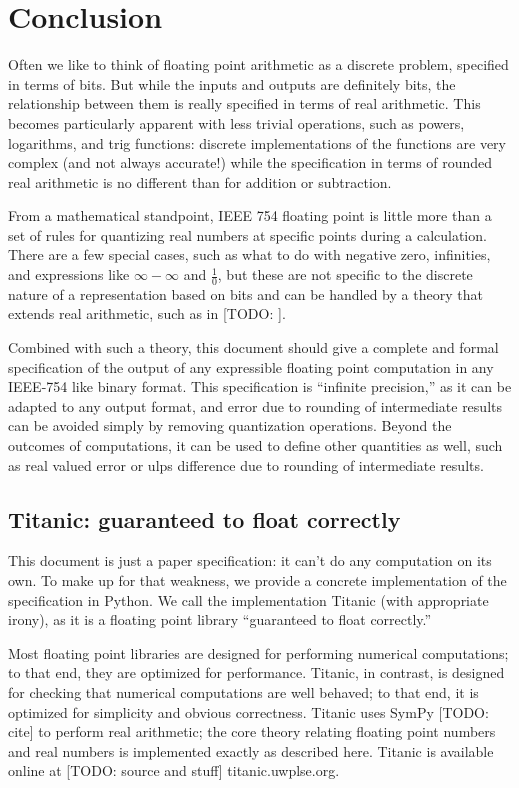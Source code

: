 \documentclass[letterpaper,10pt]{article}
\begin{document}
\section{Conclusion}

Often we like to think of floating point arithmetic as a discrete problem, specified in terms of bits. But while the inputs and outputs are definitely bits, the relationship between them is really specified in terms of real arithmetic. This becomes particularly apparent with less trivial operations, such as powers, logarithms, and trig functions: discrete implementations of the functions are very complex (and not always accurate!) while the specification in terms of rounded real arithmetic is no different than for addition or subtraction.

From a mathematical standpoint, IEEE 754 floating point is little more than a set of rules for quantizing real numbers at specific points during a calculation. There are a few special cases, such as what to do with negative zero, infinities, and expressions like $\infty - \infty$ and $\frac{1}{0}$, but these are not specific to the discrete nature of a representation based on bits and can be handled by a theory that extends real arithmetic, such as in [TODO: \cite{affinelystuffetc}].

Combined with such a theory, this document should give a complete and formal specification of the output of any expressible floating point computation in any IEEE-754 like binary format. This specification is ``infinite precision,'' as it can be adapted to any output format, and error due to rounding of intermediate results can be avoided simply by removing quantization operations. Beyond the outcomes of computations, it can be used to define other quantities as well, such as real valued error or ulps difference due to rounding of intermediate results.

\subsection{Titanic: guaranteed to float correctly}

This document is just a paper specification: it can't do any computation on its own. To make up for that weakness, we provide a concrete implementation of the specification in Python. We call the implementation Titanic (with appropriate irony), as it is a floating point library ``guaranteed to float correctly.''

Most floating point libraries are designed for performing numerical computations; to that end, they are optimized for performance. Titanic, in contrast, is designed for checking that numerical computations are well behaved; to that end, it is optimized for simplicity and obvious correctness. Titanic uses SymPy [TODO: cite] to perform real arithmetic; the core theory relating floating point numbers and real numbers is implemented exactly as described here. Titanic is available online at [TODO: source and stuff] titanic.uwplse.org.



\end{document}
